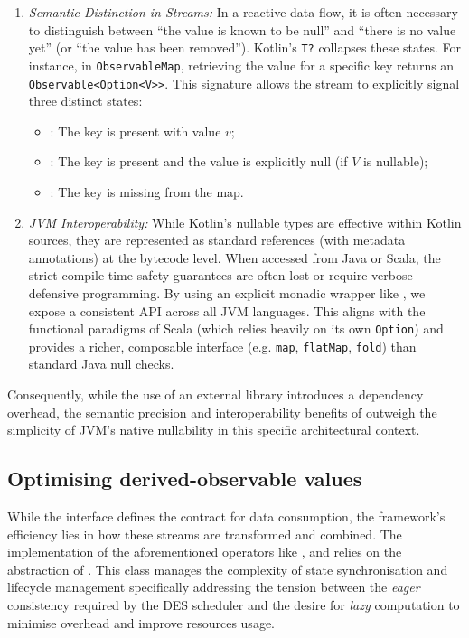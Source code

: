 \begin{enumerate}
	\item \emph{Semantic Distinction in Streams:} In a reactive data flow, it
	      is often necessary to distinguish between ``the value is known to be
	      null'' and ``there is no value yet'' (or ``the value has been
	      removed''). Kotlin's \texttt{T?} collapses these states. For instance,
	      in \texttt{ObservableMap}, retrieving the value for a specific key
	      returns an \texttt{Observable<Option<V>>}. This signature allows the
	      stream to explicitly signal three distinct states:
	      \begin{itemize}
		      \item {}: The key is present with value $v$;
		      \item {}: The key is present and the value is
		            explicitly null (if $V$ is nullable);
		      \item {}: The key is missing from the map.
	      \end{itemize}

	\item \emph{JVM Interoperability:} While Kotlin's nullable types are
	      effective within Kotlin sources, they are represented as standard
	      references (with metadata annotations) at the bytecode level. When
	      accessed from Java or Scala, the strict compile-time safety guarantees
	      are often lost or require verbose defensive programming. By using an
	      explicit monadic wrapper like \linebreak{}, we expose a
	      consistent \ac{API} across all \ac{JVM} languages. This aligns with the
	      functional paradigms of Scala (which relies heavily on its own
	      \texttt{Option}) and provides a richer, composable interface (e.g.
	      \texttt{map}, \texttt{flatMap}, \texttt{fold}) than standard Java null
	      checks.
\end{enumerate}

Consequently, while the use of an external library introduces a dependency
overhead, the semantic precision and interoperability benefits of
\linebreak{} outweigh the simplicity of \ac{JVM}'s native
nullability in this specific architectural context.

\subsection{Optimising derived-observable values}
While the  interface defines the contract for data
consumption, the framework's efficiency lies in how these streams are
transformed and combined. The implementation of the aforementioned operators
like ,  and \linebreak{} relies on the
abstraction of . This class manages the complexity
of state synchronisation and lifecycle management specifically addressing the
tension between the \emph{eager} consistency required by the \ac{DES} scheduler
and the desire for \emph{lazy} computation to minimise overhead and improve
resources usage.

